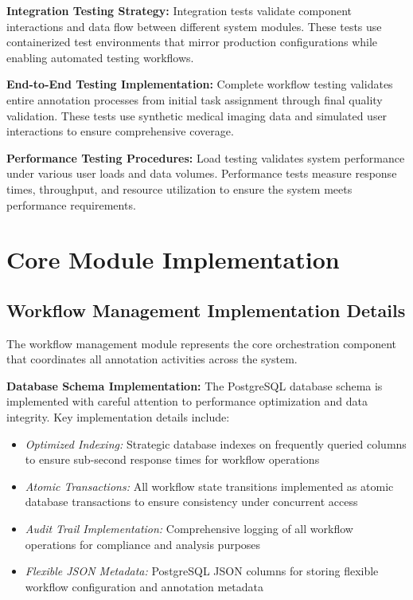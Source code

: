 \textbf{Integration Testing Strategy:} Integration tests validate component interactions and data flow between different system modules. These tests use containerized test environments that mirror production configurations while enabling automated testing workflows.

\textbf{End-to-End Testing Implementation:} Complete workflow testing validates entire annotation processes from initial task assignment through final quality validation. These tests use synthetic medical imaging data and simulated user interactions to ensure comprehensive coverage.

\textbf{Performance Testing Procedures:} Load testing validates system performance under various user loads and data volumes. Performance tests measure response times, throughput, and resource utilization to ensure the system meets performance requirements.

\section{Core Module Implementation}

\subsection{Workflow Management Implementation Details}

The workflow management module represents the core orchestration component that coordinates all annotation activities across the system.

\textbf{Database Schema Implementation:} The PostgreSQL database schema is implemented with careful attention to performance optimization and data integrity. Key implementation details include:

\begin{itemize}
    \item \textit{Optimized Indexing:} Strategic database indexes on frequently queried columns to ensure sub-second response times for workflow operations
    \item \textit{Atomic Transactions:} All workflow state transitions implemented as atomic database transactions to ensure consistency under concurrent access
    \item \textit{Audit Trail Implementation:} Comprehensive logging of all workflow operations for compliance and analysis purposes
    \item \textit{Flexible JSON Metadata:} PostgreSQL JSON columns for storing flexible workflow configuration and annotation metadata
\end{itemize}

